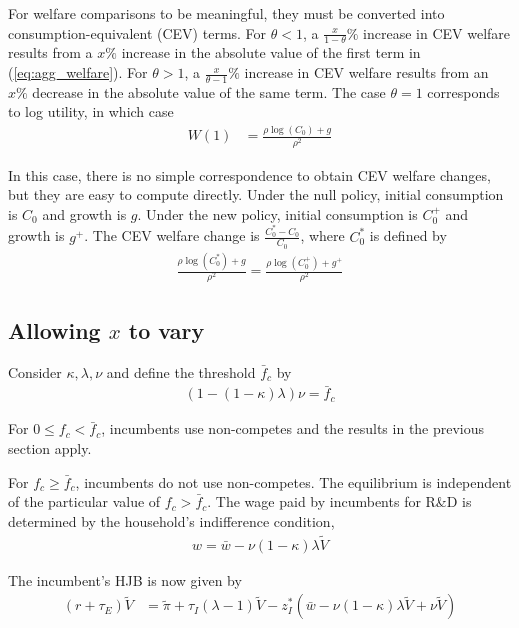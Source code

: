 \documentclass[12pt,english]{article}
\theoremstyle{remark}
\begin{document}
For welfare comparisons to be meaningful, they must be converted into consumption-equivalent (CEV) terms. For $\theta < 1$, a $\frac{x}{1-\theta}\%$ increase in CEV welfare results from a $x\%$ increase in the absolute value of the first term in (\ref{eq:agg_welfare}). For $\theta > 1$, a $\frac{x}{\theta-1}\%$ increase in CEV welfare results from an $x\%$ decrease in the absolute value of the same term. The case $\theta = 1$ corresponds to log utility, in which case
\begin{align}
	W(1) &= \frac{\rho \log(C_0) + g}{\rho^2} \label{eq:agg_welfare_log}
\end{align}

In this case, there is no simple correspondence to obtain CEV welfare changes, but they are easy to compute directly. Under the null policy, initial consumption is $C_0$ and growth is $g$. Under the new policy, initial consumption is $C_0^+$ and growth is $g^+$. The CEV welfare change is $\frac{C_0^* - C_0}{C_0}$, where $C_0^*$ is defined by 
\begin{align}
	\frac{\rho\log(C_0^*) + g}{\rho^2} = \frac{\rho \log(C_0^+) + g^+}{\rho^2} \label{eq:agg_welfare_log_CEV}
\end{align}

\subsection{Allowing $x$ to vary}

Consider $\kappa, \lambda, \nu$ and define the threshold $\bar{f}_c$ by 
\begin{align}
	(1-(1-\kappa)\lambda)\nu = \bar{f}_c
\end{align}

For $0 \le f_c < \bar{f}_c$, incumbents use non-competes and the results in the previous section apply.

For $f_c \ge \bar{f}_c$, incumbents do not use non-competes. The equilibrium is independent of the particular value of $f_c > \bar{f}_c$. The wage paid by incumbents for R\&D is determined by the household's indifference condition,
\begin{align}
	w = \bar{w} - \nu (1-\kappa) \lambda \tilde{V} \label{eq:wage_rd}
\end{align}

The incumbent's HJB is now given by 
\begin{align}
	(r + \tau_E) \tilde{V} &= \tilde{\pi} + \tau_I (\lambda - 1) \tilde{V} - z^*_I(\bar{w} - \nu (1-\kappa) \lambda \tilde{V} + \nu \tilde{V} ) \label{eq:hjb_incumbent_noNCA}
\end{align}
\end{document}
